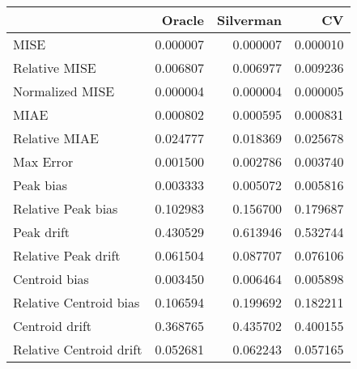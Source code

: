 \begin{tabular}{lrrr}
  \hline
 & Oracle & Silverman & CV \\ 
  \hline
MISE & 0.000007 & 0.000007 & 0.000010 \\ 
  Relative MISE & 0.006807 & 0.006977 & 0.009236 \\ 
  Normalized MISE & 0.000004 & 0.000004 & 0.000005 \\ 
  MIAE & 0.000802 & 0.000595 & 0.000831 \\ 
  Relative MIAE & 0.024777 & 0.018369 & 0.025678 \\ 
  Max Error & 0.001500 & 0.002786 & 0.003740 \\ 
  Peak bias & 0.003333 & 0.005072 & 0.005816 \\ 
  Relative Peak bias & 0.102983 & 0.156700 & 0.179687 \\ 
  Peak drift & 0.430529 & 0.613946 & 0.532744 \\ 
  Relative Peak drift & 0.061504 & 0.087707 & 0.076106 \\ 
  Centroid bias & 0.003450 & 0.006464 & 0.005898 \\ 
  Relative Centroid bias & 0.106594 & 0.199692 & 0.182211 \\ 
  Centroid drift & 0.368765 & 0.435702 & 0.400155 \\ 
  Relative Centroid drift & 0.052681 & 0.062243 & 0.057165 \\ 
   \hline
\end{tabular}
